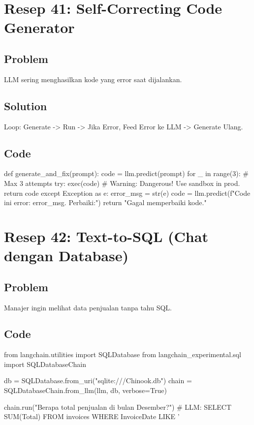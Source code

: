 \newpage

\section{Resep 41: Self-Correcting Code Generator}

\subsection*{Problem}
LLM sering menghasilkan kode yang error saat dijalankan.

\subsection*{Solution}
Loop: Generate -> Run -> Jika Error, Feed Error ke LLM -> Generate Ulang.

\subsection*{Code}
\begin{codeblock}[language=Python]
def generate_and_fix(prompt):
    code = llm.predict(prompt)
    for _ in range(3): # Max 3 attempts
        try:
            exec(code) # Warning: Dangerous! Use sandbox in prod.
            return code
        except Exception as e:
            error_msg = str(e)
            code = llm.predict(f"Code ini error: {error_msg}. Perbaiki:")
    return "Gagal memperbaiki kode."
\end{codeblock}

\newpage

\section{Resep 42: Text-to-SQL (Chat dengan Database)}

\subsection*{Problem}
Manajer ingin melihat data penjualan tanpa tahu SQL.

\subsection*{Code}
\begin{codeblock}[language=Python]
from langchain.utilities import SQLDatabase
from langchain_experimental.sql import SQLDatabaseChain

db = SQLDatabase.from_uri("sqlite:///Chinook.db")
chain = SQLDatabaseChain.from_llm(llm, db, verbose=True)

chain.run("Berapa total penjualan di bulan Desember?")
# LLM: SELECT SUM(Total) FROM invoices WHERE InvoiceDate LIKE '%
\end{codeblock}

